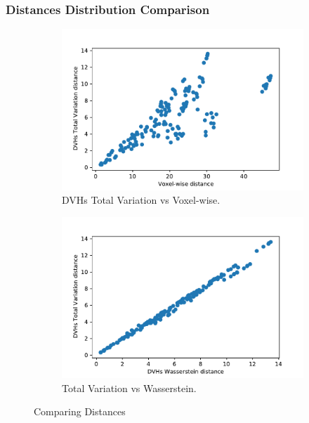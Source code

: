 \subsubsection{Distances Distribution Comparison}
\begin{figure}
	\centering
	\begin{subfigure}[c]{0.49\textwidth}
		\includegraphics[width=\linewidth]{dose_distances_figures/TotalVariation-Voxelwise.pdf}	
		\caption{DVHs Total Variation vs Voxel-wise.}
		\label{fig:TotalVariation-Voxelwise}
	\end{subfigure}
	\begin{subfigure}[c]{0.49\textwidth}
		\includegraphics[width=\linewidth]{dose_distances_figures/TotalVariation-Wasserstein.pdf}
		\caption{Total Variation vs Wasserstein.}
		\label{fig:TotalVariation-Wasserstein}
	\end{subfigure}
	\caption{Comparing Distances}
\end{figure}

